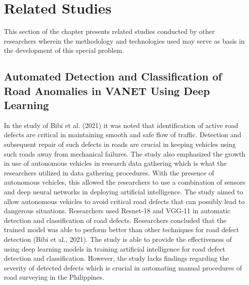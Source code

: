 \section{Related Studies}
This section of the chapter presents related studies conducted by other researchers wherein the methodology and technologies used may serve as basis in the development of this special problem.

\subsection{Automated Detection and Classification of Road Anomalies in VANET Using Deep Learning}
In the study of Bibi et al. (2021) it was noted that identification of active road defects are critical in maintaining smooth and safe flow of traffic. Detection and subsequent repair of such defects in roads are crucial in keeping vehicles using such roads away from mechanical failures. The study also emphasized the growth in use of autonomous vehicles in research data gathering which is what the researchers utilized in data gathering procedures. With the presence of autonomous vehicles, this allowed the researchers to use a combination of sensors and deep neural networks in deploying artificial intelligence. The study aimed to allow autonomous vehicles to avoid critical road defects that can possibly lead to dangerous situations. Researchers used Resnet-18 and VGG-11 in automatic detection and classification of road defects. Researchers concluded that the trained model was able to perform better than other techniques for road defect detection (Bibi et al., 2021). The study is able to provide the effectiveness of using deep learning models in training artificial intelligence for road defect detection and classification. However, the study lacks findings regarding the severity of detected defects which is crucial in automating manual procedures of road surveying in the Philippines.

